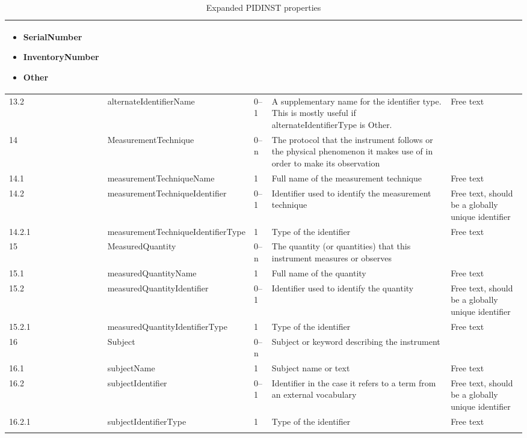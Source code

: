 \documentclass[titlepage=true,twoside=false,DIV=13]{scrartcl}
\begin{document}
\begin{longtable}{|l|p{\propcolw}|l|p{}|p{\valcolw}|}
\begin{minipage}[t]{\valcolw}
             \begin{itemize}[nosep,leftmargin=3.5ex]
             \item SerialNumber
             \item InventoryNumber
             \item Other
             \end{itemize}
             \vspace{1ex}
           \end{minipage} \\
  \hline
  13.2   & alternateIdentifierName              & 0--1
         & A supplementary name for the identifier type.  This is
           mostly useful if alternateIdentifierType is Other.
         & Free text \\
  \hline
  14     & MeasurementTechnique                 & 0--n
         & The protocol that the instrument follows or the physical
           phenomenon it makes use of in order to make its observation
         & \\
  \hline
  14.1   & measurementTechniqueName             & 1
         & Full name of the measurement technique  & Free text \\
  \hline
  14.2   & measurementTechnique\-Identifier     & 0--1
         & Identifier used to identify the measurement technique
         & Free text, should be a globally unique identifier \\
  \hline
  14.2.1 & measurementTechnique\-IdentifierType & 1
         & Type of the identifier & Free text \\
  \hline
  15     & MeasuredQuantity                     & 0--n
         & The quantity (or quantities) that this instrument measures
           or observes
         & \\
  \hline
  15.1   & measuredQuantityName                 & 1
         & Full name of the quantity & Free text \\
  \hline
  15.2   & measuredQuantityIdentifier           & 0--1
         & Identifier used to identify the quantity
         & Free text, should be a globally unique identifier \\
  \hline
  15.2.1 & measuredQuantity\-IdentifierType     & 1
         & Type of the identifier & Free text \\
  \hline
  16     & Subject                              & 0--n
         & Subject or keyword describing the instrument & \\
  \hline
  16.1   & subjectName                          & 1
         & Subject name or text & Free text \\
  \hline
  16.2   & subjectIdentifier                    & 0--1
         & Identifier in the case it refers to a term from an external
           vocabulary
         & Free text, should be a globally unique identifier \\
  \hline
  16.2.1 & subjectIdentifierType                & 1
         & Type of the identifier & Free text \\
  \hline
  \caption{Expanded PIDINST properties}
  \label{tab:schema:expandprops}
\end{longtable}
\end{document}
